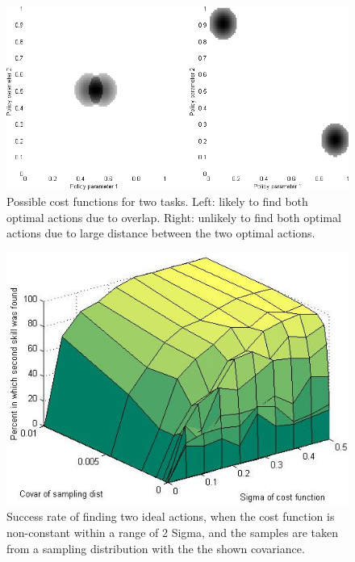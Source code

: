 \documentclass[12pt]{article}
\begin{document}
\begin{figure}[ht]
  \centering
  \includegraphics[width=0.9\columnwidth]{cost_function.png}
  \caption{ Possible cost functions for two tasks. Left: likely to find both optimal actions due to overlap. Right: unlikely to find both optimal actions due to large distance between the two optimal actions.}
  \label{fig:costfunction}
\end{figure}

\begin{figure}[ht]
  \centering
  \includegraphics[width=0.6\columnwidth]{sigma_vs_covar.png}
  \caption{\label{fig_sigma_vs_covar} Success rate of finding two ideal actions, when the cost function is non-constant within a range of 2 Sigma, and the samples are taken from a sampling distribution with the the shown covariance. }
  \label{fig:sigmavscovar}
\end{figure}
\end{document}
